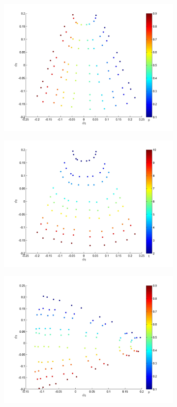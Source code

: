\documentclass[prl, reprint, final]{revtex4-1}
\begin{document}
\begin{figure}
\begin{subfigure}{0.4\textwidth}
\includegraphics[width=\textwidth]{EMD2_p_10}
\caption{}
\end{subfigure}
\begin{subfigure}{0.4\textwidth}
\includegraphics[width=\textwidth]{EMD2_t_10}
\caption{}
\end{subfigure}
\begin{subfigure}{0.4\textwidth}
\includegraphics[width=\textwidth]{EMD2_p_20}

\end{subfigure}
\end{figure}
\end{document}
